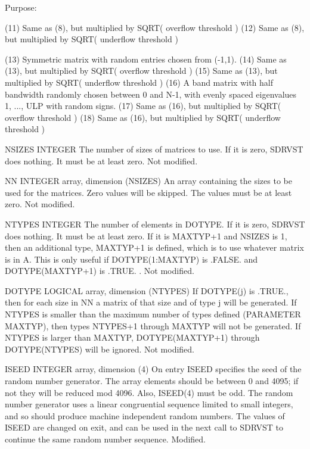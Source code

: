 \begin{DoxyParagraph}{Purpose\+: }
\begin{DoxyVerb}
      (11) Same as (8), but multiplied by SQRT( overflow threshold )
      (12) Same as (8), but multiplied by SQRT( underflow threshold )

      (13) Symmetric matrix with random entries chosen from (-1,1).
      (14) Same as (13), but multiplied by SQRT( overflow threshold )
      (15) Same as (13), but multiplied by SQRT( underflow threshold )
      (16) A band matrix with half bandwidth randomly chosen between
           0 and N-1, with evenly spaced eigenvalues 1, ..., ULP
           with random signs.
      (17) Same as (16), but multiplied by SQRT( overflow threshold )
      (18) Same as (16), but multiplied by SQRT( underflow threshold )\end{DoxyVerb}
 \begin{DoxyVerb}  NSIZES  INTEGER
          The number of sizes of matrices to use.  If it is zero,
          SDRVST does nothing.  It must be at least zero.
          Not modified.

  NN      INTEGER array, dimension (NSIZES)
          An array containing the sizes to be used for the matrices.
          Zero values will be skipped.  The values must be at least
          zero.
          Not modified.

  NTYPES  INTEGER
          The number of elements in DOTYPE.   If it is zero, SDRVST
          does nothing.  It must be at least zero.  If it is MAXTYP+1
          and NSIZES is 1, then an additional type, MAXTYP+1 is
          defined, which is to use whatever matrix is in A.  This
          is only useful if DOTYPE(1:MAXTYP) is .FALSE. and
          DOTYPE(MAXTYP+1) is .TRUE. .
          Not modified.

  DOTYPE  LOGICAL array, dimension (NTYPES)
          If DOTYPE(j) is .TRUE., then for each size in NN a
          matrix of that size and of type j will be generated.
          If NTYPES is smaller than the maximum number of types
          defined (PARAMETER MAXTYP), then types NTYPES+1 through
          MAXTYP will not be generated.  If NTYPES is larger
          than MAXTYP, DOTYPE(MAXTYP+1) through DOTYPE(NTYPES)
          will be ignored.
          Not modified.

  ISEED   INTEGER array, dimension (4)
          On entry ISEED specifies the seed of the random number
          generator. The array elements should be between 0 and 4095;
          if not they will be reduced mod 4096.  Also, ISEED(4) must
          be odd.  The random number generator uses a linear
          congruential sequence limited to small integers, and so
          should produce machine independent random numbers. The
          values of ISEED are changed on exit, and can be used in the
          next call to SDRVST to continue the same random number
          sequence.
          Modified.


\end{DoxyVerb}
\end{DoxyParagraph}

